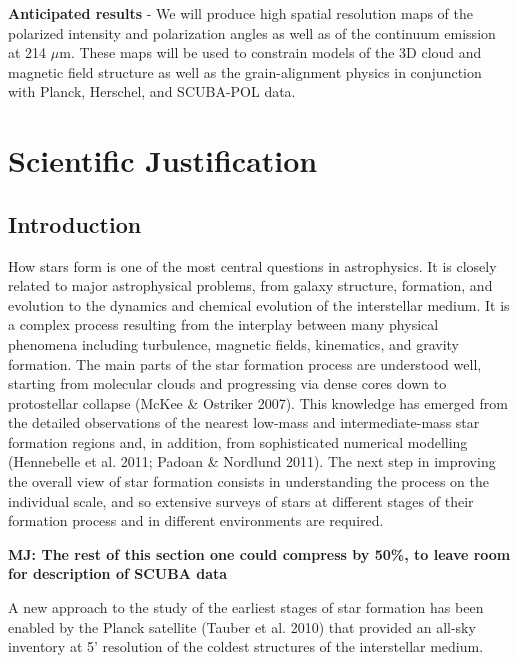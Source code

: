 \documentclass[11pt]{amsart}
\begin{document}
{\bf Anticipated results} - We will produce high spatial resolution maps of the polarized intensity and polarization angles as well as of the 
continuum emission at 214 $\mu$m. 
These maps will be used to constrain models of the 3D cloud and magnetic field structure as well as the grain-alignment physics in conjunction
with Planck, Herschel, and SCUBA-POL data.

\newpage

\section{Scientific Justification}



\subsection{Introduction}

How stars form is one of the most central questions in astrophysics.
It is closely related to major astrophysical problems,
from galaxy structure, formation, and evolution to the dynamics
and chemical evolution of the interstellar medium. It is a complex
process resulting from the interplay between many physical
phenomena including turbulence, magnetic fields, kinematics,
and gravity formation. 
The main parts of the star formation process are understood well, starting from molecular
clouds and progressing via dense cores down to protostellar
collapse (McKee \& Ostriker 2007). This knowledge has
emerged from the detailed observations of the nearest low-mass
and intermediate-mass star formation regions and, in addition,
from sophisticated numerical modelling (Hennebelle et al. 2011;
Padoan \& Nordlund 2011). The next step in improving the overall
view of star formation consists in understanding the process
on the individual scale, and so extensive surveys of stars at different
stages of their formation process and in different environments
are required.

{\bf MJ: The rest of this section one could compress by 50\%, to leave room for description of SCUBA data}

A new approach to the study of the earliest stages of star formation
has been enabled by the Planck satellite (Tauber et al.
2010) that provided
an all-sky inventory at 5' resolution
of the coldest structures of the interstellar
medium. 
\end{document}
